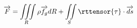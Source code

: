 \begin{equation}
  \overrightarrow{F} = \iiint\limits_R\rho\overrightarrow{f_g} dR + \iint\limits_S\rttensor{\tau}\cdot \overrightarrow{ds}
\end{equation}

